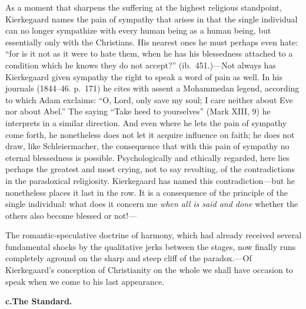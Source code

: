 \documentclass[12pt,a4paper]{book}
\newcommand{\opage}[1]{\marginnote{\footnotesize\textit{[#1]}}}
\begin{document}
As a moment that sharpens the suffering at the highest religious
standpoint, Kierkegaard names the pain of sympathy that arises in that the
single individual can no longer sympathize with every human being as a
human being, but essentially only with the Christians. His nearest ones
he must perhaps even hate: ``for is it not as it were to hate them, when
he has his blessedness attached to a condition which he knows they do not
accept?'' (ib.\ 451.)---Not always has Kierkegaard given sympathy the
right to speak a word of pain as well. In his journals (1844--46.
p.~171) he cites with assent a Mohammedan legend,
\opage{119}according to which Adam exclaims: ``O, Lord, only save my
soul; I care neither about Eve nor about Abel.'' The saying ``Take heed
to yourselves'' (Mark XIII, 9) he interprets in a similar direction. And
even where he lets the pain of sympathy come forth, he nonetheless does
not let it acquire influence on faith; he does not draw, like
Schleiermacher, the consequence that with this pain of sympathy no
eternal blessedness is possible. Psychologically and ethically regarded,
here lies perhaps the greatest and most crying, not to say revolting, of
the contradictions in the paradoxical religiosity. Kierkegaard has named
this contradiction---but he nonetheless places it last in the row. It is
a consequence of the principle of the single individual: what does it
concern me \textit{when all is said and done} whether the others also
become blessed or not!---

The romantic-speculative doctrine of harmony, which had already received
several fundamental shocks by the qualitative jerks between the stages,
now finally runs completely aground on the sharp and steep cliff of the
paradox.---Of Kierkegaard's conception of Christianity on the whole we
shall have occasion to speak when we come to his last appearance.

\begin{center}\textbf{c.\enspace The Standard.}\end{center}
\end{document}
